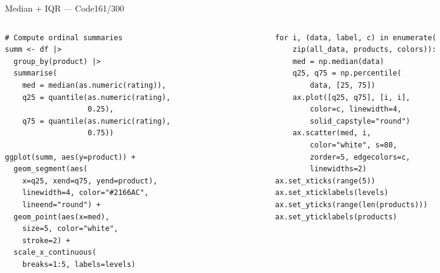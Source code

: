 \documentclass[10pt]{beamer}
\newcommand{\smark}[1]{\hfill{\scriptsize\color{codegray}#1}}
\begin{document}
\begin{frame}[fragile]{Median + IQR --- Code}\smark{161/300}
\begin{columns}[T]
\begin{column}{0.48\textwidth}
\begin{lstlisting}[style=Rstyle]
# Compute ordinal summaries
summ <- df |>
  group_by(product) |>
  summarise(
    med = median(as.numeric(rating)),
    q25 = quantile(as.numeric(rating),
                   0.25),
    q75 = quantile(as.numeric(rating),
                   0.75))

ggplot(summ, aes(y=product)) +
  geom_segment(aes(
    x=q25, xend=q75, yend=product),
    linewidth=4, color="#2166AC",
    lineend="round") +
  geom_point(aes(x=med),
    size=5, color="white",
    stroke=2) +
  scale_x_continuous(
    breaks=1:5, labels=levels)
\end{lstlisting}
\end{column}
\begin{column}{0.48\textwidth}
\begin{lstlisting}[style=Pystyle]
for i, (data, label, c) in enumerate(
    zip(all_data, products, colors)):
    med = np.median(data)
    q25, q75 = np.percentile(
        data, [25, 75])
    ax.plot([q25, q75], [i, i],
        color=c, linewidth=4,
        solid_capstyle="round")
    ax.scatter(med, i,
        color="white", s=80,
        zorder=5, edgecolors=c,
        linewidths=2)
ax.set_xticks(range(5))
ax.set_xticklabels(levels)
ax.set_yticks(range(len(products)))
ax.set_yticklabels(products)
\end{lstlisting}
\end{column}
\end{columns}
\end{frame}
\end{document}

